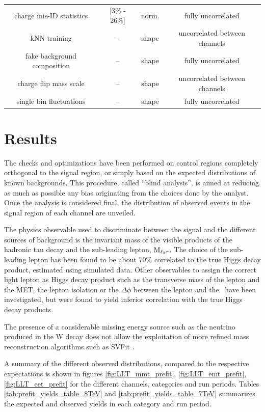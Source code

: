 \begin{table}
\begin{center}
\begin{tabular}{c c c c}
      charge mis-ID statistics & [3\% - 26\%] & norm. & fully uncorrelated \\
      kNN training & -- & shape & uncorrelated between channels \\
      fake background composition & -- & shape & fully uncorrelated \\
      charge flip mass scale & -- & shape & uncorrelated between channels \\
      single bin fluctuations & -- & shape & fully uncorrelated \\
      \hline
    \end{tabular}
  \end{center}
\end{table}

\section{Results}

The checks and optimizations have been performed on control regions completely orthogonal to the signal region, or simply based on the expected distributions of known backgrounds. This procedure, called ``blind analysis'', is aimed at reducing as much as possible any bias originating from the choices done by the analyst. 
Once the analysis is considered final, the distribution of observed events in the signal region of each channel are unveiled. 

The physics observable used to discriminate between the signal and the different sources of background is the invariant mass of the visible products of the hadronic tau decay and the sub-leading lepton, $\rm{M}_{\ell_2 \tau}$. The choice of the sub-leading lepton has been found to be about 70\% correlated to the true Higgs decay product, estimated using simulated data. Other observables to assign the correct light lepton as Higgs decay product such as the transverse mass of the lepton and the MET, the lepton isolation or the $\Delta\phi$ between the lepton and the \MET\ have been investigated, but were found to yield inferior correlation with the true Higgs decay products.

The presence of a considerable missing energy source such as the neutrino produced in the W decay does not allow the exploitation of more refined mass reconstruction algorithms such as SVFit \cite{H_tautau}.

A summary of the different observed distributions, compared to the respective expectations is shown in figures \ref{fig:LLT_mmt_prefit}, \ref{fig:LLT_emt_prefit}, \ref{fig:LLT_eet_prefit} for the different channels, categories and run periods. Tables \ref{tab:prefit_yields_table_8TeV} and \ref{tab:prefit_yields_table_7TeV} summarizes the expected and observed yields in each category and run period.

